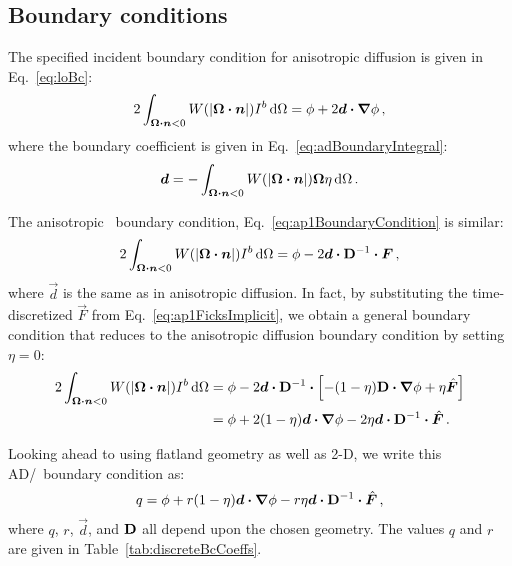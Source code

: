 \subsection{Boundary conditions}

The specified incident boundary condition for anisotropic diffusion is given in
Eq.~\eqref{eq:loBc}:
\begin{equation*}
2\int_{\bm{\Omega}\bm{\cdot}\bm{n} < 0} W(\left| \bm{\Omega}\bm{\cdot}\bm{n} \right|)
I^b \mathop{}\!\mathrm{d}\Omega
=
\phi
+ 2 \bm{d} \bm{\cdot} \bm{\nabla} \phi\,,
\end{equation*}
where the boundary coefficient is given in Eq.~\eqref{eq:adBoundaryIntegral}:
\begin{equation*}
  \bm{d} = -\int_{\bm{\Omega}\bm{\cdot}\bm{n} < 0} W(\left| \bm{\Omega}\bm{\cdot}\bm{n} \right|)
\bm{\Omega} \eta \mathop{}\!\mathrm{d}\Omega\,.
\end{equation*}

The anisotropic \Pone\ boundary condition, Eq.~\eqref{eq:ap1BoundaryCondition}
is similar:
\begin{equation*}
  2 \int_{\bm{\Omega}\bm{\cdot}\bm{n} < 0}
  W(\left| \bm{\Omega}\bm{\cdot}\bm{n} \right|) I^b \mathop{}\!\mathrm{d}\Omega
  = \phi
  - 2 \bm{d} \bm{\cdot} \mathbf{D}^{-1} \bm{\cdot} \bm{F} \,,
\end{equation*}
where $\vec{d}$ is the same as in anisotropic diffusion.
In fact, by substituting the time-discretized $\vec{F}$ from
Eq.~\eqref{eq:ap1FicksImplicit}, we obtain a general boundary condition that
reduces to the anisotropic diffusion boundary condition by setting $\eta=0$:
\begin{align*}
  2 \int_{\bm{\Omega}\bm{\cdot}\bm{n} < 0}
  W(\left| \bm{\Omega}\bm{\cdot}\bm{n} \right|) I^b \mathop{}\!\mathrm{d}\Omega
  &= \phi
  - 2 \bm{d} \bm{\cdot} \mathbf{D}^{-1} \bm{\cdot} 
  \left[ - (1 - \eta)\mathbf{D} \bm{\cdot} \bm{\nabla} \phi + \eta \hat{\bm{F}} \right]
  \\
  &=  \phi + 2 (1 - \eta) \bm{d} \bm{\cdot} \bm{\nabla} \phi
  - 2 \eta \bm{d} \bm{\cdot} \mathbf{D}^{-1} \bm{\cdot} \hat{\bm{F}} \,.
\end{align*}

Looking ahead to using flatland geometry as well as 2-D, we write this
AD/\APone\ boundary condition as:
\begin{equation}\label{eq:discreteBcGeneral}
  q = \phi + r (1 - \eta) \bm{d} \bm{\cdot} \bm{\nabla} \phi
  - r \eta \bm{d} \bm{\cdot} \mathbf{D}^{-1} \bm{\cdot} \hat{\bm{F}}\,,
\end{equation}
where $q$, $r$, $\vec{d}$, and $\mathbf{D}$ all depend upon the chosen geometry. The
values $q$ and $r$ are given in Table~\ref{tab:discreteBcCoeffs}.

